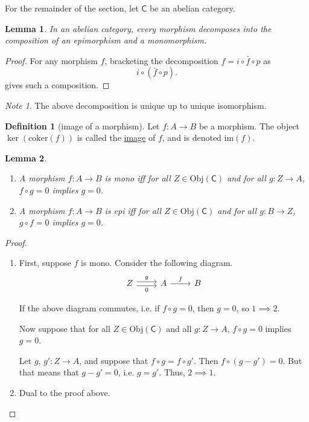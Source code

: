 \documentclass[a4paper]{report}
\newcommand{\defn}[1]{\ul{#1}}
\newcommand{\Obj}{\mathrm{Obj}}
\newcommand{\coker}{\mathrm{coker}}
\newcommand{\im}{\mathrm{im}}
\theoremstyle{definition}
\newtheorem{definition}{Definition}[section]
\theoremstyle{plain}
\newtheorem{lemma}{Lemma}[section]
\theoremstyle{remark}
\newtheorem{note}{Note}[section]
\begin{document}
For the remainder of the section, let $\mathsf{C}$ be an abelian category.

\begin{lemma}
  In an abelian category, every morphism decomposes into the composition of an epimorphism and a monomorphism.
\end{lemma}
\begin{proof}
  For any morphism $f$, bracketing the decomposition $f = i \circ \bar{f} \circ p$ as
  \begin{equation*}
    i \circ (\bar{f} \circ p).
  \end{equation*}
  gives such a composition.
\end{proof}

\begin{note}
  The above decomposition is unique up to unique isomorphism.
\end{note}

\begin{definition}[image of a morphism]
  \label{def:imageofamorphism}
  Let $f\colon A \to B$ be a morphism. The object $\ker(\coker(f))$ is called the \defn{image} of $f$, and is denoted $\im(f)$.
\end{definition}

\begin{lemma}
  \label{lemma:morphismwhichkillsontherightismono}
  $\,$
  \begin{enumerate}
    \item A morphism $f\colon A \to B$ is mono iff for all $Z \in \Obj(\mathsf{C})$ and for all $g\colon Z \to A$, $f \circ g = 0$ implies $g = 0$.
    \item A morphism $f\colon A \to B$ is epi iff for all $Z \in \Obj(\mathsf{C})$ and for all $g\colon B \to Z$, $g \circ f = 0$ implies $g = 0$.
  \end{enumerate}
\end{lemma}
\begin{proof}
  $\,$
  \begin{enumerate}
    \item First, suppose $f$ is mono. Consider the following diagram.
      \begin{equation*}
        \begin{tikzcd}
          Z
          \arrow[r, shift left, "g"]
          \arrow[r, swap, shift right, "0"]
          & A
          \arrow[r, "f"]
          & B
        \end{tikzcd}
      \end{equation*}

      If the above diagram commutes, i.e. if $f \circ g = 0$, then $g = 0$, so $1 \implies 2$.

      Now suppose that for all $Z \in \Obj(\mathsf{C})$ and all $g\colon Z \to A$, $f \circ g = 0$ implies $g = 0$.

      Let $g$, $g'\colon Z \to A$, and suppose that $f \circ g = f \circ g'$. Then $f \circ (g - g') = 0$. But that means that $g - g' = 0$, i.e. $g = g'$. Thus, $2 \implies 1$.

    \item Dual to the proof above.
  \end{enumerate}
\end{proof}
\end{document}
